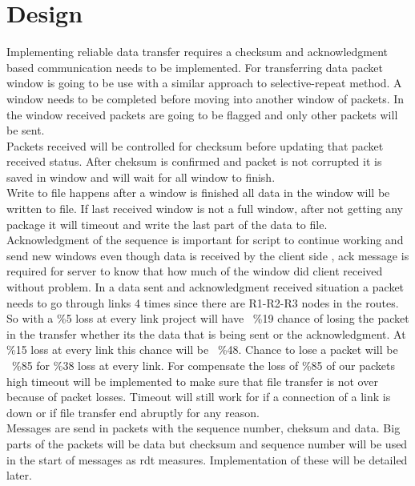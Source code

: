 \documentclass[conference]{IEEEtran}
\begin{document}
\section{Design}

Implementing reliable data transfer requires a checksum and acknowledgment based communication needs to be implemented. For transferring data packet window is going to be use with a similar approach to selective-repeat method. A window needs to be completed before moving into another window of packets. In the window received packets are going to be flagged and only other packets will be sent. \\

Packets received will be controlled for checksum before updating that packet received status. After cheksum is confirmed and packet is not corrupted it is saved in window and will wait for all window to finish.\\
 
Write to file happens after a window is finished all data in the window will be written to file. If last received window is not a full window, after not getting any package it will timeout and write the last part of the data to file. \\

Acknowledgment of the sequence is important for script to continue working and send new windows even though data is received  by the client side , ack message is required for server to know that how much of the window did client received without problem. In a data sent and acknowledgment received situation a packet needs to go through links 4 times since there are R1-R2-R3 nodes in the routes. So with a \%5 loss at every link project will have ~\%19 chance of losing the packet in the transfer whether its the data that is being sent or the acknowledgment. At \%15 loss at every link this chance will be  ~\%48. Chance to lose a packet will be ~\%85 for \%38 loss  at every link. For compensate the loss of \%85 of our packets high timeout will be implemented to make sure that file transfer is not over because of packet losses. Timeout will still work for if a connection of a link is down or if file transfer end abruptly for any reason. \\

Messages are send in packets with the sequence number, cheksum and data. Big parts of the packets will be data but checksum and sequence number will be used in the start of messages as rdt measures. Implementation of these will be detailed later.\\
\end{document}
